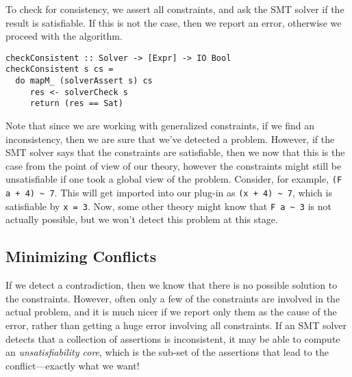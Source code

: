 \documentclass{sigplanconf}
\begin{document}
To check for consistency, we assert all constraints, and ask the SMT
solver if the result is satisfiable.  If this is not the case, then
we report an error, otherwise we proceed with the algorithm.
\begin{Verbatim}
checkConsistent :: Solver -> [Expr] -> IO Bool
checkConsistent s cs =
  do mapM_ (solverAssert s) cs
     res <- solverCheck s
     return (res == Sat)
\end{Verbatim}

Note that since we are working with generalized constraints, if we find an
inconsistency, then we are sure that we've detected a problem.  However,
if the SMT solver says that the constraints are satisfiable, then
we now that this is the case from the point of view of our theory,
however the constraints might still be unsatisfiable if one took a global
view of the problem.  Consider, for example, \Verb"(F a + 4) ~ 7".
This will get imported into our plug-in as \Verb"(x + 4) ~ 7", which is
satisfiable by \Verb"x = 3".  Now, some other theory might know that
\Verb"F a ~ 3" is not actually possible, but we won't detect this problem
at this stage.

\subsection{Minimizing Conflicts}
If we detect a contradiction, then
we know that there is no possible solution to the constraints.  However,
often only a few of the constraints are involved in the actual problem,
and it is much nicer if we report only them as the cause of the error,
rather than getting a huge error involving all constraints.  If an SMT
solver detects that a collection of assertions is inconsistent, it may
be able to compute an {\em unsatisfiability core}, which is the sub-set
of the assertions that lead to the conflict---exactly what we want!
\end{document}

